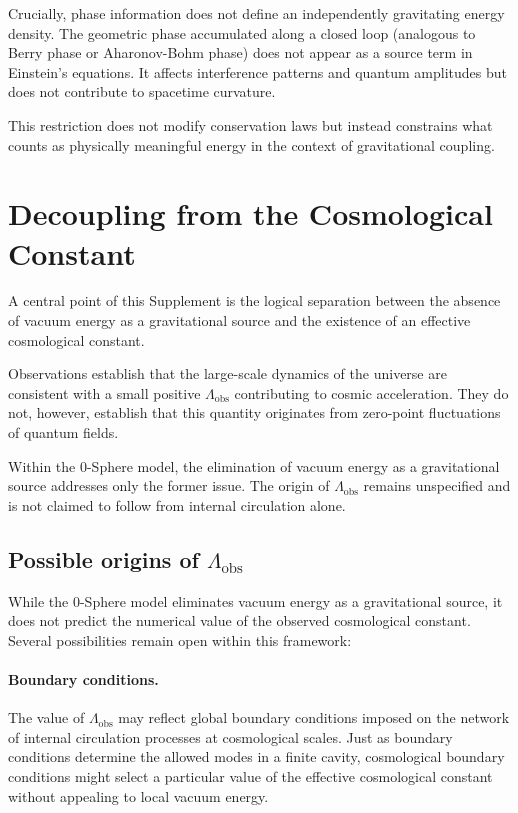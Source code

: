 \documentclass[12pt,letterpaper]{article}
\begin{document}
Crucially, phase information does not define an independently gravitating energy density. The geometric phase accumulated along a closed loop (analogous to Berry phase or Aharonov-Bohm phase) does not appear as a source term in Einstein's equations. It affects interference patterns and quantum amplitudes but does not contribute to spacetime curvature.

This restriction does not modify conservation laws but instead constrains what counts as physically meaningful energy in the context of gravitational coupling.


\section{Decoupling from the Cosmological Constant}

A central point of this Supplement is the logical separation between the absence of vacuum energy as a gravitational source and the existence of an effective cosmological constant.

Observations establish that the large-scale dynamics of the universe are consistent with a small positive $\Lambda_{\mathrm{obs}}$ contributing to cosmic acceleration. They do not, however, establish that this quantity originates from zero-point fluctuations of quantum fields.

Within the 0-Sphere model, the elimination of vacuum energy as a gravitational source addresses only the former issue. The origin of $\Lambda_{\mathrm{obs}}$ remains unspecified and is not claimed to follow from internal circulation alone.

\subsection{Possible origins of $\Lambda_{\mathrm{obs}}$}

While the 0-Sphere model eliminates vacuum energy as a gravitational source, it does not predict the numerical value of the observed cosmological constant. Several possibilities remain open within this framework:

\paragraph{Boundary conditions.}
The value of $\Lambda_{\mathrm{obs}}$ may reflect global boundary conditions imposed on the network of internal circulation processes at cosmological scales. Just as boundary conditions determine the allowed modes in a finite cavity, cosmological boundary conditions might select a particular value of the effective cosmological constant without appealing to local vacuum energy.
\end{document}
